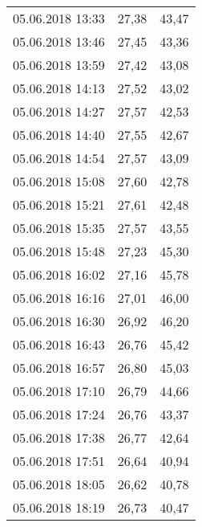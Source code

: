 \documentclass[a4paper,11pt,twoside]{article}
\begin{document}
\begin{longtable}[c]{ccc}
05.06.2018 13:33       & 27,38                & 43,47                          \\
05.06.2018 13:46       & 27,45                & 43,36                          \\
05.06.2018 13:59       & 27,42                & 43,08                          \\
05.06.2018 14:13       & 27,52                & 43,02                          \\
05.06.2018 14:27       & 27,57                & 42,53                          \\
05.06.2018 14:40       & 27,55                & 42,67                          \\
05.06.2018 14:54       & 27,57                & 43,09                          \\
05.06.2018 15:08       & 27,60                & 42,78                          \\
05.06.2018 15:21       & 27,61                & 42,48                          \\
05.06.2018 15:35       & 27,57                & 43,55                          \\
05.06.2018 15:48       & 27,23                & 45,30                          \\
05.06.2018 16:02       & 27,16                & 45,78                          \\
05.06.2018 16:16       & 27,01                & 46,00                          \\
05.06.2018 16:30       & 26,92                & 46,20                          \\
05.06.2018 16:43       & 26,76                & 45,42                          \\
05.06.2018 16:57       & 26,80                & 45,03                          \\
05.06.2018 17:10       & 26,79                & 44,66                          \\
05.06.2018 17:24       & 26,76                & 43,37                          \\
05.06.2018 17:38       & 26,77                & 42,64                          \\
05.06.2018 17:51       & 26,64                & 40,94                          \\
05.06.2018 18:05       & 26,62                & 40,78                          \\
05.06.2018 18:19       & 26,73                & 40,47                          \\

\end{longtable}
\end{document}
